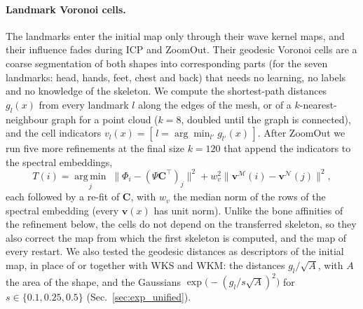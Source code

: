 \documentclass[11pt]{article}
\newcommand{\M}{\mathcal{M}}
\newcommand{\N}{\mathcal{N}}
\newcommand{\C}{\mathbf{C}}
\begin{document}
\paragraph{Landmark Voronoi cells.}
The landmarks enter the initial map only through their wave kernel maps, and
their influence fades during ICP and ZoomOut. Their geodesic Voronoi cells
are a coarse segmentation of both shapes into corresponding parts (for the
seven landmarks: head, hands, feet, chest and back) that needs no learning,
no labels and no knowledge of the skeleton. We compute the shortest-path
distances $g_l(x)$ from every landmark $l$ along the edges of the mesh, or of
a $k$-nearest-neighbour graph for a point cloud ($k = 8$, doubled until the
graph is connected), and the cell indicators
$v_l(x) = [\,l = \arg\min_{l'} g_{l'}(x)\,]$. After ZoomOut we run five more
refinements at the final size $k = 120$ that append the indicators to the
spectral embeddings,
\begin{equation}
  T(i) = \operatorname*{arg\,min}_{j} \;\big\|\Phi_i - (\Psi\C^\top)_j\big\|^2 + w_v^2 \|\mathbf{v}^\M(i) - \mathbf{v}^\N(j)\|^2 ,
\end{equation}
each followed by a re-fit of $\C$, with $w_v$ the median norm of the rows of
the spectral embedding (every $\mathbf{v}(x)$ has unit norm). Unlike the bone affinities of the
refinement below, the cells do not depend on the transferred skeleton, so
they also correct the map from which the first skeleton is computed, and the
map of every restart. We also tested the geodesic distances as descriptors
of the initial map, in place of or together with WKS and WKM: the distances
$g_l / \sqrt{A}$, with $A$ the area of the shape, and the Gaussians
$\exp\!\big(-(g_l / s\sqrt{A})^2\big)$ for $s \in \{0.1, 0.25, 0.5\}$
(Sec.~\ref{sec:exp_unified}).
\end{document}
